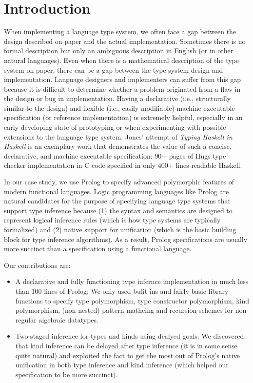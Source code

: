 \section{Introduction}\label{sec:intro}
When implementing a language type system, we often face a gap between
the design described on paper and the actual implementation. Sometimes
there is no formal description but only an ambiguous description in English
(or in other natural languages). Even when there is a mathematical description
of the type system on paper, there can be a gap between the type system design
and implementation. Language designers and implementers can suffer from this gap
because it is difficult to determine whether a problem originated from a flaw
in the design or bug in implementation.
Having a declarative (i.e., structurally similar to the design)
and flexible (i.e., easily modifiable) machine executable specification
(or reference implementation) is extremely helpful, especially
in an early developing state of prototyping or when experimenting with
possible extensions to the language type system.  
Jones' attempt of \emph{Typing Haskell in Haskell} \cite{JonesTHiH99} is
an exemplary work that demonstrates the value of such a concise, declarative,
and machine executable specification:
90+ pages of Hugs type checker implementation in C code specified in
only 400+ lines readable Haskell.

In our case study, we use Prolog to specify advanced polymorphic features of
modern functional languages. Logic programming languages like Prolog
are natural candidates for the purpose of specifying language type systems
that support type inference because (1) the syntax and semantics are
designed to represent logical inference rules (which is how type systems
are typically formalized) and (2) native support for unification (which
is the basic building block for type inference algorithms). As a result,
Prolog specifications are usually more succinct than a specification
using a functional language.

Our contributions are:
\begin{itemize}\vspace*{-1.75ex}
\item A declarative and fully functioning type infernce implementation
in much less than 100 lines of Prolog: We only used bulit-ins and
fairly basic library functions to specify
type polymorphism, type constructor polymorphism, kind polymorphism,
(non-nested) pattern-mathcing and recursion schemes for non-regular
algebraic datatypes.
\item Two-staged inference for types and kinds using dealyed goals:
We discovered that kind inference can be delayed after type inference
(it is in some sense quite natural) and exploited the fact to get the
most out of Prolog's native unification in both type inference and
kind inference (which helped our specification to be more succinct).
\end{itemize}


